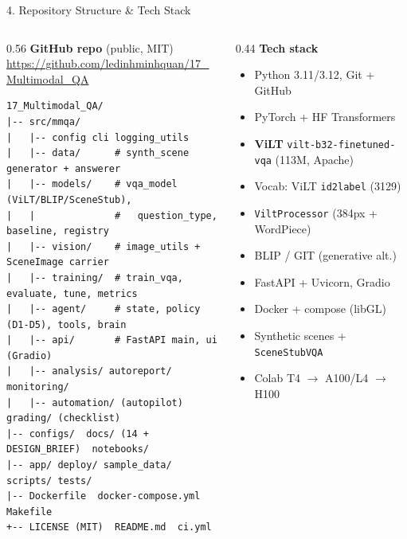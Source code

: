 \documentclass[10pt,aspectratio=169]{beamer}
\begin{document}
\begin{frame}[fragile]{4. Repository Structure \& Tech Stack}
\begin{columns}[T]
\begin{column}{0.56\textwidth}
\textbf{GitHub repo} (public, MIT) \\
\scriptsize \url{https://github.com/ledinhminhquan/17_Multimodal_QA}

\vspace{0.15cm}
\begin{lstlisting}[basicstyle=\ttfamily\tiny]
17_Multimodal_QA/
|-- src/mmqa/
|   |-- config cli logging_utils
|   |-- data/      # synth_scene generator + answerer
|   |-- models/    # vqa_model (ViLT/BLIP/SceneStub),
|   |              #   question_type, baseline, registry
|   |-- vision/    # image_utils + SceneImage carrier
|   |-- training/  # train_vqa, evaluate, tune, metrics
|   |-- agent/     # state, policy (D1-D5), tools, brain
|   |-- api/       # FastAPI main, ui (Gradio)
|   |-- analysis/ autoreport/ monitoring/
|   |-- automation/ (autopilot)  grading/ (checklist)
|-- configs/  docs/ (14 + DESIGN_BRIEF)  notebooks/
|-- app/ deploy/ sample_data/ scripts/ tests/
|-- Dockerfile  docker-compose.yml  Makefile
+-- LICENSE (MIT)  README.md  ci.yml
\end{lstlisting}
\end{column}
\begin{column}{0.44\textwidth}
\textbf{Tech stack}
\begin{itemize}\small
  \item Python 3.11/3.12, Git + GitHub
  \item PyTorch + HF Transformers
  \item \textbf{ViLT} \texttt{vilt-b32-finetuned-vqa} (113M, Apache)
  \item Vocab: ViLT \texttt{id2label} (3129)
  \item \texttt{ViltProcessor} (384px + WordPiece)
  \item BLIP / GIT (generative alt.)
  \item FastAPI + Uvicorn, Gradio
  \item Docker + compose (libGL)
  \item Synthetic scenes + \texttt{SceneStubVQA}
  \item Colab T4 $\rightarrow$ A100/L4 $\rightarrow$ H100
\end{itemize}
\end{column}
\end{columns}
\end{frame}
\end{document}
